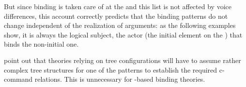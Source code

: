 \documentclass[output=paper,biblatex,babelshorthands,newtxmath,draftmode,colorlinks,citecolor=brown]{langscibook}
\begin{document}
But since binding is taken care of at the \argstl and this list is not affected by voice
differences, this account correctly predicts that the binding patterns do not change independent of
the realization of arguments: as the following examples show, it is always the logical subject, the
actor (the initial element on the \argstl) that binds the non-initial one.
\eal
{}
\zl
\eal
{}
\zl

\citet[]{MS98a} point out that theories relying on tree configurations will have to assume
rather complex tree structures for one of the patterns to establish the required c-command
relations. This is unnecessary for \argst-based binding theories.
\end{document}
